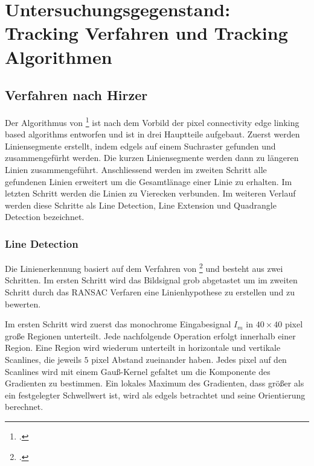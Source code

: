 \section{Untersuchungsgegenstand: Tracking Verfahren und Tracking Algorithmen} %
\label{sec:untersuchungsgegenstand}
\begin{comment}
	Untersuchungsgegenstand: Verfahren und Algorithmen präzise vorstellen und ihre Unterschiede hervorheben.
	Notwendige Kriterien der Algorithmen bestimmen

	Grober Ablauf der Verfahren:
	* Wer hats erfunden?
	* Wie ist das Verfahren aufgebaut (Algo in grob)
	* Welche Kriterien müssen erfüllt sein (monochrome, rgb eingabe)?
\end{comment}

\subsection{Verfahren nach Hirzer} %
\label{sub:verfahren_nach_hirzer}

Der Algorithmus von \citeauthor{hirzer08}\footcite{hirzer08} ist nach dem Vorbild der pixel connectivity edge linking based algorithms entworfen und ist in drei Hauptteile aufgebaut. Zuerst werden Liniensegmente erstellt, indem \gls{edgels} auf einem Suchraster gefunden und zusammengefürht werden. Die kurzen Liniensegmente werden dann zu längeren Linien zusammengeführt. Anschliessend werden im zweiten Schritt alle gefundenen Linien erweitert um die Gesamtlänage einer Linie zu erhalten. Im letzten Schritt werden die Linien zu Vierecken verbunden. Im weiteren Verlauf werden diese Schritte als Line Detection, Line Extension und Quadrangle Detection bezeichnet.

\subsubsection{Line Detection} %
\label{sub:line_detection}
Die Linienerkennung basiert auf dem Verfahren von \citeauthor{clarke96}\footcite{clarke96} und besteht aus zwei Schritten. Im ersten Schritt wird das Bildsignal grob abgetastet um im zweiten Schritt durch das RANSAC Verfaren eine Linienhypothese zu erstellen und zu bewerten.

Im ersten Schritt wird zuerst das monochrome Eingabesignal $I_m$ in $40 \times 40$ \gls{pixel} große Regionen
 unterteilt. Jede nachfolgende Operation erfolgt innerhalb einer Region. Eine Region wird wiederum unterteilt in
 horizontale und vertikale Scanlines, die jeweils $5$ \gls{pixel} Abstand zueinander haben. Jedes \gls{pixel} auf den
 Scanlines wird mit einem Gauß-Kernel gefaltet um die Komponente des Gradienten zu bestimmen. Ein lokales Maximum des
 Gradienten, dass größer als ein festgelegter Schwellwert ist, wird als \gls{edgels} betrachtet und seine Orientierung
 berechnet.

